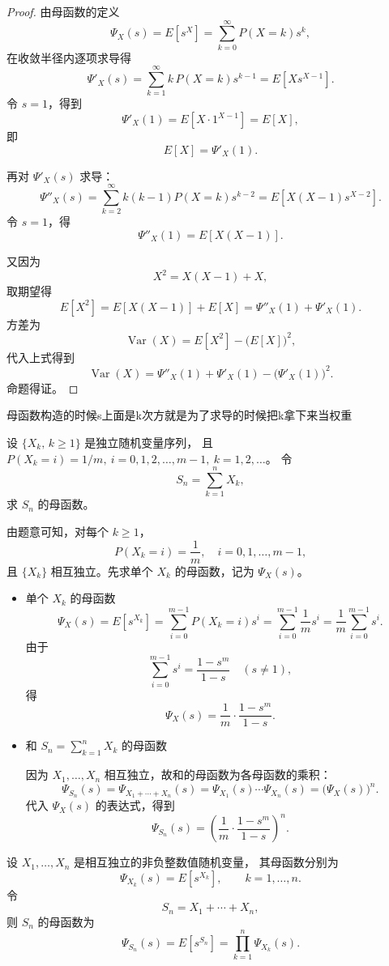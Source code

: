 \begin{proof}
由母函数的定义
\[
\Psi_X(s)=E[s^X]=\sum_{k=0}^{\infty}P(X=k)s^k,
\]
在收敛半径内逐项求导得
\[
\Psi'_X(s)=\sum_{k=1}^{\infty}k\,P(X=k)s^{k-1}
         =E[Xs^{X-1}].
\]
令 $s=1$，得到
\[
\Psi'_X(1)=E[X\cdot1^{X-1}]=E[X],
\]
即
\[
E[X]=\Psi'_X(1).
\]

再对 $\Psi'_X(s)$ 求导：
\[
\Psi''_X(s)=\sum_{k=2}^{\infty}k(k-1)P(X=k)s^{k-2}
          =E[X(X-1)s^{X-2}].
\]
令 $s=1$，得
\[
\Psi''_X(1)=E[X(X-1)].
\]

又因为
\[
X^2=X(X-1)+X,
\]
取期望得
\[
E[X^2]=E[X(X-1)]+E[X]=\Psi''_X(1)+\Psi'_X(1).
\]
方差为
\[
\operatorname{Var}(X)=E[X^2]-\bigl(E[X]\bigr)^2,
\]
代入上式得到
\[
\operatorname{Var}(X)
=\Psi''_X(1)+\Psi'_X(1)-\bigl(\Psi'_X(1)\bigr)^2.
\]
命题得证。
\end{proof}
\begin{dxtips}
    母函数构造的时候s上面是k次方就是为了求导的时候把k拿下来当权重
\end{dxtips}
\begin{homework}[4.16]
设 $\{X_k,\,k\ge 1\}$ 是独立随机变量序列，
且 $P(X_k=i)=1/m,\ i=0,1,2,\dots,m-1,\ k=1,2,\dots$。
令
\[
S_n=\sum_{k=1}^n X_k,
\]
求 $S_n$ 的母函数。
\end{homework}
\begin{solution}
由题意可知，对每个 $k\ge1$，
\[
P(X_k=i)=\frac1m,\quad i=0,1,\dots,m-1,
\]
且 $\{X_k\}$ 相互独立。先求单个 $X_k$ 的母函数，记为 $\Psi_X(s)$。

\begin{itemize}
  \item[(1)] 单个 $X_k$ 的母函数
  \[
  \Psi_X(s)=E[s^{X_k}]
  =\sum_{i=0}^{m-1} P(X_k=i)s^i
  =\sum_{i=0}^{m-1} \frac1m s^i
  =\frac1m\sum_{i=0}^{m-1}s^i.
  \]
  由于
  \[
  \sum_{i=0}^{m-1}s^i=\frac{1-s^m}{1-s}\quad (s\neq1),
  \]
  得
  \[
  \Psi_X(s)=\frac1m\cdot\frac{1-s^m}{1-s}.
  \]

  \item[(2)] 和 $S_n=\sum_{k=1}^n X_k$ 的母函数

  因为 $X_1,\dots,X_n$ 相互独立，故和的母函数为各母函数的乘积：
  \[
  \Psi_{S_n}(s)
  =\Psi_{X_1+\cdots+X_n}(s)
  =\Psi_{X_1}(s)\cdots\Psi_{X_n}(s)
  =\bigl(\Psi_X(s)\bigr)^n.
  \]
  代入 $\Psi_X(s)$ 的表达式，得到
  \[
  \Psi_{S_n}(s)
  =\left(\frac1m\cdot\frac{1-s^m}{1-s}\right)^n.
  \]
\end{itemize}
\end{solution}
\begin{theorem}[独立随机变量和的母函数]
设 $X_1,\dots,X_n$ 是相互独立的非负整数值随机变量，
其母函数分别为
\[
\Psi_{X_k}(s)=E[s^{X_k}],\qquad k=1,\dots,n.
\]
令
\[
S_n = X_1+\cdots+X_n,
\]
则 $S_n$ 的母函数为
\[
\Psi_{S_n}(s) = E[s^{S_n}]
             = \prod_{k=1}^n \Psi_{X_k}(s).
\]
\end{theorem}

